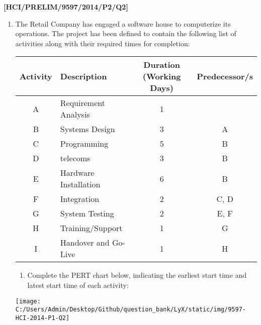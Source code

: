 \item \textbf{{[}HCI/PRELIM/9597/2014/P2/Q2{]} }
\begin{enumerate}
\item The Retail Company has engaged a software house to computerize its
operations. The project has been defined to contain the following
list of activities along with their required times for completion:
\noindent \begin{center}
\begin{tabular}{|c|l|c|c|}
\hline 
Activity & Description & Duration (Working Days) & Predecessor/s\tabularnewline
\hline 
\hline 
A & Requirement Analysis & 1 & \tabularnewline
\hline 
B & Systems Design & 3 & A\tabularnewline
\hline 
C & Programming & 5 & B\tabularnewline
\hline 
D & telecoms & 3 & B\tabularnewline
\hline 
E & Hardware Installation & 6 & B\tabularnewline
\hline 
F & Integration & 2 & C, D\tabularnewline
\hline 
G & System Testing & 2 & E, F\tabularnewline
\hline 
H & Training/Support & 1 & G\tabularnewline
\hline 
I & Handover and Go-Live & 1 & H\tabularnewline
\hline 
\end{tabular}
\par\end{center}
\begin{enumerate}
\item Complete the PERT chart below, indicating the earliest start time
and latest start time of each activity: 
\end{enumerate}
\begin{center}
\texttt{[image: C:/Users/Admin/Desktop/Github/question\_bank/LyX/static/img/9597-HCI-2014-P1-Q2]}
\par\end{center}


\end{enumerate}
